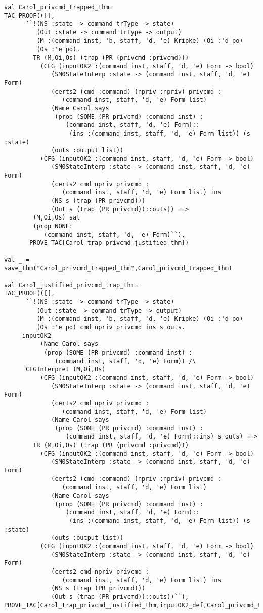 \documentclass{report}
\begin{document}
\begin{lstlisting}[frame=TBlr]
val Carol_privcmd_trapped_thm=
TAC_PROOF(([],
      ``!(NS :state -> command trType -> state)
         (Out :state -> command trType -> output)
         (M :(command inst, 'b, staff, 'd, 'e) Kripke) (Oi :'d po)
         (Os :'e po).
        TR (M,Oi,Os) (trap (PR (privcmd :privcmd)))
          (CFG (inputOK2 :(command inst, staff, 'd, 'e) Form -> bool)
             (SM0StateInterp :state -> (command inst, staff, 'd, 'e) Form)
             (certs2 (cmd :command) (npriv :npriv) privcmd :
                (command inst, staff, 'd, 'e) Form list)
             (Name Carol says
              (prop (SOME (PR privcmd) :command inst) :
                 (command inst, staff, 'd, 'e) Form)::
                  (ins :(command inst, staff, 'd, 'e) Form list)) (s :state)
             (outs :output list))
          (CFG (inputOK2 :(command inst, staff, 'd, 'e) Form -> bool)
             (SM0StateInterp :state -> (command inst, staff, 'd, 'e) Form)
             (certs2 cmd npriv privcmd :
                (command inst, staff, 'd, 'e) Form list) ins
             (NS s (trap (PR privcmd)))
             (Out s (trap (PR privcmd))::outs)) ==>
        (M,Oi,Os) sat
        (prop NONE:
           (command inst, staff, 'd, 'e) Form)``),
	   PROVE_TAC[Carol_trap_privcmd_justified_thm])

val _ = save_thm("Carol_privcmd_trapped_thm",Carol_privcmd_trapped_thm)

val Carol_justified_privcmd_trap_thm=
TAC_PROOF(([],
      ``!(NS :state -> command trType -> state)
         (Out :state -> command trType -> output)
         (M :(command inst, 'b, staff, 'd, 'e) Kripke) (Oi :'d po)
         (Os :'e po) cmd npriv privcmd ins s outs.
	 inputOK2
          (Name Carol says
           (prop (SOME (PR privcmd) :command inst) :
              (command inst, staff, 'd, 'e) Form)) /\
	  CFGInterpret (M,Oi,Os)
          (CFG (inputOK2 :(command inst, staff, 'd, 'e) Form -> bool)
             (SM0StateInterp :state -> (command inst, staff, 'd, 'e) Form)
             (certs2 cmd npriv privcmd :
                (command inst, staff, 'd, 'e) Form list)
             (Name Carol says
              (prop (SOME (PR privcmd) :command inst) :
                 (command inst, staff, 'd, 'e) Form)::ins) s outs) ==>
        TR (M,Oi,Os) (trap (PR (privcmd :privcmd)))
          (CFG (inputOK2 :(command inst, staff, 'd, 'e) Form -> bool)
             (SM0StateInterp :state -> (command inst, staff, 'd, 'e) Form)
             (certs2 (cmd :command) (npriv :npriv) privcmd :
                (command inst, staff, 'd, 'e) Form list)
             (Name Carol says
              (prop (SOME (PR privcmd) :command inst) :
                 (command inst, staff, 'd, 'e) Form)::
                  (ins :(command inst, staff, 'd, 'e) Form list)) (s :state)
             (outs :output list))
          (CFG (inputOK2 :(command inst, staff, 'd, 'e) Form -> bool)
             (SM0StateInterp :state -> (command inst, staff, 'd, 'e) Form)
             (certs2 cmd npriv privcmd :
                (command inst, staff, 'd, 'e) Form list) ins
             (NS s (trap (PR privcmd)))
             (Out s (trap (PR privcmd))::outs))``),
PROVE_TAC[Carol_trap_privcmd_justified_thm,inputOK2_def,Carol_privcmd_trap_lemma])


\end{lstlisting}
\end{document}
